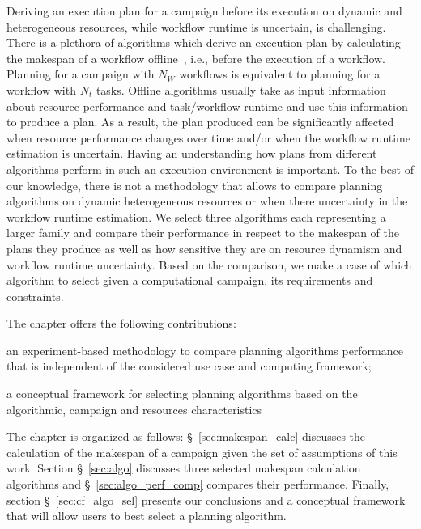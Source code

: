 Deriving an execution plan for a campaign before its execution on dynamic and 
heterogeneous resources, while workflow runtime is uncertain, is challenging.
There is a plethora of algorithms which derive an execution plan by 
calculating the makespan of a workflow offline~\cite{lu2019review}, i.e., 
before the execution of a workflow. Planning for a campaign with $N_W$ 
workflows is equivalent to planning for a workflow with $N_t$ tasks. Offline 
algorithms usually take as input information about resource performance and 
task/workflow runtime and use this information to produce a plan. As a result, 
the plan produced can be significantly affected when resource performance 
changes over time and/or when the workflow runtime estimation is uncertain.
Having an understanding how plans from different algorithms perform in such an 
execution environment is important. To the best of our knowledge, there is not 
a methodology that allows to compare planning algorithms on dynamic 
heterogeneous resources or when there uncertainty in the workflow runtime 
estimation. We select three algorithms each representing a larger family and 
compare their performance in respect to the makespan of the plans they produce 
as well as how sensitive they are on resource dynamism and workflow runtime 
uncertainty. Based on the comparison, we make a case of which algorithm to 
select given a computational campaign, its requirements and constraints.

The chapter offers the following contributions:
\begin{inparaenum}[i)]
    \item an experiment-based methodology to compare planning algorithms performance that is independent of the considered use case and computing framework;
    \item a conceptual framework for selecting planning algorithms based on the algorithmic, campaign and resources characteristics
\end{inparaenum}

The chapter is organized as follows: \S~\ref{sec:makespan_calc} discusses the 
calculation of the makespan of a campaign given the set of assumptions of this 
work. Section \S~\ref{sec:algo} discusses three selected makespan calculation 
algorithms and \S~\ref{sec:algo_perf_comp} compares their performance. 
Finally, section \S~\ref{sec:cf_algo_sel} presents our conclusions and a 
conceptual framework that will allow users to best select a planning algorithm.

